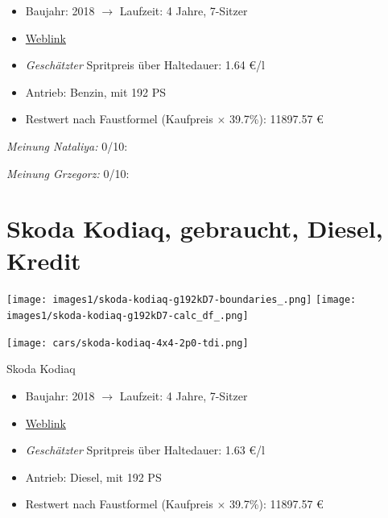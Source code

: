 \documentclass[landscape, DIV=99, 14pt]{scrartcl}
\begin{document}
\begin{itemize}
    \item Baujahr: 2018 $\rightarrow$ Laufzeit: 4 Jahre, 7-Sitzer
    \item \href{https://suchen.mobile.de/fahrzeuge/details.html?action=parkItem&id=336255689}{Weblink}
    \item \emph{Gesch\"atzter} Spritpreis \"uber Haltedauer: 1.64 \euro{}/l
    \item Antrieb: Benzin, mit 192 PS
    \item Restwert nach Faustformel (Kaufpreis $\times$ 39.7\%): 11897.57 \euro{}
\end{itemize}

\begin{small}
\emph{Meinung Nataliya:} 0/10: 
        
\emph{Meinung Grzegorz:} 0/10: 
\end{small}

\pagebreak


\twocolumn

\section*{Skoda Kodiaq, gebraucht, Diesel, Kredit}
\begin{center}
\texttt{[image: images1/skoda-kodiaq-g192kD7-boundaries\_.png]}
\null
\vspace{0.5cm}
\texttt{[image: images1/skoda-kodiaq-g192kD7-calc\_df\_.png]}
\end{center}

\pagebreak
\begin{center}
\texttt{[image: cars/skoda-kodiaq-4x4-2p0-tdi.png]}

Skoda Kodiaq
\end{center}

\begin{itemize}
    \item Baujahr: 2018 $\rightarrow$ Laufzeit: 4 Jahre, 7-Sitzer
    \item \href{https://suchen.mobile.de/fahrzeuge/details.html?action=parkItem&id=336544234}{Weblink}
    \item \emph{Gesch\"atzter} Spritpreis \"uber Haltedauer: 1.63 \euro{}/l
    \item Antrieb: Diesel, mit 192 PS
    \item Restwert nach Faustformel (Kaufpreis $\times$ 39.7\%): 11897.57 \euro{}
\end{itemize}
\end{document}

